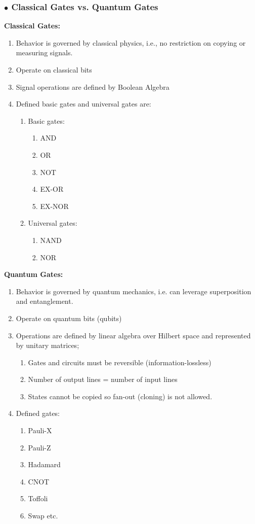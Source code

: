 \documentclass[12pt]{report}
\begin{document}
\subsubsection{$\bullet$ Classical Gates vs. Quantum Gates}
\hspace{5mm}\textbf{Classical Gates:}
\begin{enumerate}
\item  Behavior is governed by classical physics, i.e., no restriction on copying or measuring signals.
\item Operate on classical bits
\item Signal operations are defined by Boolean Algebra
\item Defined basic gates and universal gates are:
\begin{enumerate}
\item Basic gates:
\begin{enumerate}
\item AND
\item OR
\item NOT
\item EX-OR
\item EX-NOR
\end{enumerate}	
\item Universal gates:
\begin{enumerate}
\item NAND
\item NOR
\end{enumerate}
\end{enumerate}
\end{enumerate}
\hspace{5mm}\textbf{Quantum Gates:}
\begin{enumerate}
\item Behavior is governed by quantum mechanics, i.e. can leverage superposition and entanglement.
\item Operate on quantum bits (qubits)
\item Operations are defined by linear algebra over Hilbert space and represented by unitary matrices;
\begin{enumerate}
\item Gates and circuits must be reversible (information-lossless)
\item Number of output lines = number of input lines
\item States cannot be copied so fan-out (cloning) is not allowed.
\end{enumerate}
\item Defined gates:
\begin{enumerate}
\item Pauli-X
\item Pauli-Z
\item Hadamard 
\item CNOT
\item Toffoli
\item Swap etc. 
\end{enumerate}
\end{enumerate}
\end{document}
